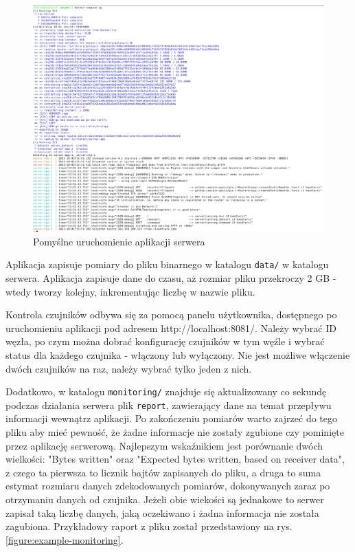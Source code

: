\documentclass[12pt,oneside,a4paper]{book}
\theoremstyle{break}
\begin{document}
\begin{figure}[H]
    \begin{center}
        \includegraphics[width=\textwidth]{server_launch.png}
        \caption{Pomyślne uruchomienie aplikacji serwera}
        \label{figure:server-app-launch}
    \end{center}
\end{figure}

Aplikacja zapisuje pomiary do pliku binarnego w katalogu \texttt{data/}
w katalogu serwera. Aplikacja zapisuje dane do czasu, aż
rozmiar pliku przekroczy 2 GB - wtedy tworzy kolejny, inkrementując
liczbę w nazwie pliku.
\par Kontrola czujników odbywa się za pomocą panelu użytkownika, 
dostępnego po uruchomieniu aplikacji pod adresem
http://localhost:8081/. Należy wybrać ID 
węzła, po czym można dobrać konfigurację czujników w tym 
węźle i wybrać status dla każdego czujnika - włączony lub wyłączony. 
Nie jest możliwe włączenie dwóch czujników na raz, należy wybrać tylko 
jeden z nich.
\par Dodatkowo, w katalogu \texttt{monitoring/} znajduje się 
aktualizowany co sekundę podczas działania serwera 
plik \texttt{report}, zawierający dane na temat przepływu 
informacji wewnątrz aplikacji. Po zakończeniu pomiarów warto zajrzeć
do tego pliku aby mieć pewność, że żadne informacje nie zostały 
zgubione czy pominięte przez aplikację serwerową. Najlepszym wskaźnikiem jest
porównanie dwóch wielkości: "Bytes written" oraz 
"Expected bytes written, based on receiver data", z czego ta pierwsza
to licznik bajtów zapisanych do pliku, a druga to suma 
estymat rozmiaru danych zdekodowanych pomiarów, 
dokonywanych zaraz po otrzymaniu danych od czujnika. 
Jeżeli obie wiekości są jednakowe to serwer zapisał taką liczbę danych, 
jaką oczekiwano i żadna informacja nie została zagubiona.
Przykładowy raport z pliku został przedstawiony na rys. \ref*{figure:example-monitoring}.
\end{document}
